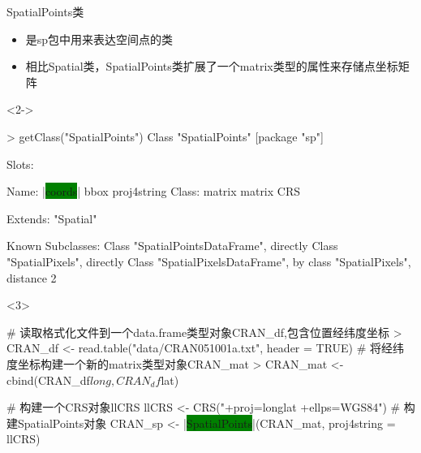 \begin{frame}[t,fragile]{\subsecname}{SpatialPoints类}
\begin{itemize}
\item<1-> 是sp包中用来表达空间点的类
\item<2-> 相比Spatial类，SpatialPoints类扩展了一个matrix类型的属性来存储点坐标矩阵
\end{itemize}

\begin{overlayarea}{\textwidth}{\textheight}
\begin{onlyenv}<2->
\begin{rcode}
> getClass("SpatialPoints")
Class "SpatialPoints" [package "sp"]

Slots:
                                          
Name:       |\colorbox{green}{coords}|        bbox proj4string
Class:      matrix      matrix         CRS

Extends: "Spatial"

Known Subclasses: 
Class "SpatialPointsDataFrame", directly
Class "SpatialPixels", directly
Class "SpatialPixelsDataFrame", by class "SpatialPixels", distance 2
\end{rcode}
\end{onlyenv}

\begin{onlyenv}<3>
\begin{rcode}
# 读取格式化文件到一个data.frame类型对象CRAN\_df,包含位置经纬度坐标
> CRAN_df <- read.table("data/CRAN051001a.txt", header = TRUE)
# 将经纬度坐标构建一个新的matrix类型对象CRAN\_mat
> CRAN_mat <- cbind(CRAN_df$long, CRAN_df$lat)

# 构建一个CRS对象llCRS 
llCRS <- CRS("+proj=longlat +ellps=WGS84")
# 构建SpatialPoints对象
CRAN_sp <- |\colorbox{green}{SpatialPoints}|(CRAN_mat, proj4string = llCRS)
\end{rcode}
\end{onlyenv}
\end{overlayarea}
\end{frame}

